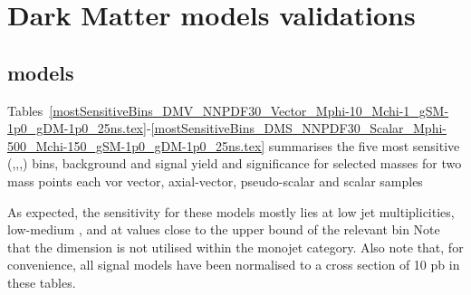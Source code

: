 \section{Dark Matter models validations}
\label{sec:dm_checklist}

\subsection{\DMj models}

Tables~\ref{mostSensitiveBins_DMV_NNPDF30_Vector_Mphi-10_Mchi-1_gSM-1p0_gDM-1p0_25ns.tex}-\ref{mostSensitiveBins_DMS_NNPDF30_Scalar_Mphi-500_Mchi-150_gSM-1p0_gDM-1p0_25ns.tex} summarises the five most sensitive (\njet,\nb,\scalht,\mht) bins, background and signal yield and significance for selected \DMbb masses for two mass points each vor vector, axial-vector, pseudo-scalar and scalar samples

As expected, the sensitivity for these models mostly lies at low jet
multiplicities, low-medium \scalht, and at \mht values close to the upper bound
of the relevant \scalht bin Note that the \mht dimension is not utilised within 
the monojet category. Also note that, for convenience, all signal models have 
been normalised to a cross section of 10 pb in these tables.




\\
\\

\\
\\

\\
\\

\\
\\



